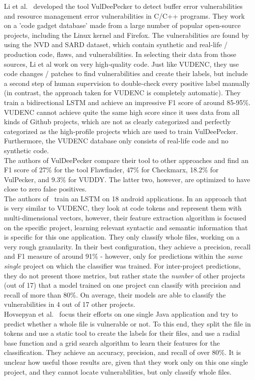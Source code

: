 \documentclass[
a4paper,
pagesize,
pdftex,
12pt,
twoside, %
BCOR=5mm, %
ngerman,
fleqn,
final,
]{scrartcl}
\begin{document}
	Li et al.~\cite{Li.2018} developed the tool VulDeePecker to detect buffer error vulnerabilities and resource management error vulnerabilities in C/C++ programs. They work on a 'code gadget database' made from a large number of popular open-source projects, including the Linux kernel and Firefox. The vulnerabilities are found by using the NVD and SARD dataset, which contain synthetic and real-life / production code, flaws, and vulnerabilities. In selecting their data from those sources, Li et al work on very high-quality code. Just like VUDENC, they use code changes / patches to find vulnerabilities and create their labels, but include a second step of human supervision to double-check every positive label manually (in contrast, the approach taken for VUDENC is completely automatic). They train a bidirectional LSTM and achieve an impressive F1 score of around 85-95\%. VUDENC cannot achieve quite the same high score since it uses data from all kinds of Github projects, which are not as clearly categorized and perfectly categorized as the high-profile projects which are used to train VulDeePecker. Furthermore, the VUDENC database only consists of real-life code and no synthetic code.\\
	The authors of VulDeePecker compare their tool to other approaches and find an F1 score of 27\% for the tool Flawfinder, 47\% for Checkmarx, 18.2\% for VulPecker, and 9.3\% for VUDDY. The latter two, however, are optimized to have close to zero false positives.\\	
	The authors of~\cite{Dam.2017} train an LSTM on 18 android applications. In an approach that is very similar to VUDENC, they look at code tokens and represent them with multi-dimensional vectors, however, their feature extraction algorithm is focused on the specific project, learning relevant syntactic and semantic information that is specific for this one application. They only classify whole files, working on a very rough granularity. In their best configuration, they achieve a precision, recall and F1 measure of around 91\% - however, only for predictions within the \textit{same single} project on which the classifier was trained. For inter-project predictions, they do not present those metrics, but rather state the \textit{number} of other projects (out of 17) that a model trained on one project can classify with precision and recall of more than 80\%. On average, their models are able to classify the vulnerabilities in 4 out of 17 other projects.\\	
	Hovsepyan et al.~\cite{Hovsepyan.2012} focus their efforts on one single Java application and try to predict whether a whole file is vulnerable or not. To this end, they split the file in tokens and use a static tool to create the labels for their files, and use a radial base function and a grid search algorithm to learn their features for the classification. They achieve an accuracy, precision, and recall of over 80\%. It is unclear how useful those results are, given that they work only on this one single project, and they cannot locate vulnerabilities, but only classify whole files. 
	
\end{document}
